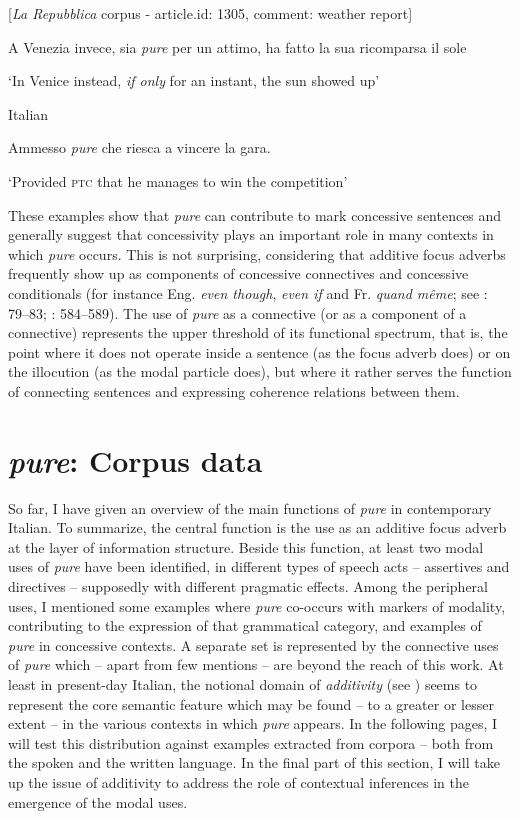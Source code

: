 \ea%
    \label{ex:key:29}

          [\textit{La Repubblica} corpus - article.id: 1305, comment: weather report]

A Venezia invece, sia \textit{pure} per un attimo, ha fatto la sua ricomparsa il sole

\glt ‘In Venice instead, \textit{if only} for an instant, the sun showed up’
    \z

\ea%
    \label{ex:key:30}

           Italian \citep[115]{Coniglio2008}

Ammesso \textit{pure} che riesca a vincere la gara.

\glt ‘Provided \textsc{ptc} that he manages to win the competition’
    \z

These examples show that \textit{pure} can contribute to mark concessive sentences and generally suggest that concessivity plays an important role in many contexts in which \textit{pure} occurs. This is not surprising, considering that additive focus adverbs frequently show up as components of concessive connectives and concessive conditionals (for instance Eng. \textit{even though}, \textit{even if} and Fr. \textit{quand même}; see \citealt{König1991}: 79–83; \citealt{HaspelmathKönig1998}: 584–589). The use of \textit{pure} as a connective (or as a component of a connective) represents the upper threshold of its functional spectrum, that is, the point where it does not operate inside a sentence (as the focus adverb does) or on the illocution (as the modal particle does), but where it rather serves the function of connecting sentences and expressing coherence relations between them.

\section{\textit{pure}: Corpus data}
\hypertarget{Toc124860652}{}
So far, I have given an overview of the main functions of \textit{pure} in contemporary Italian. To summarize, the central function is the use as an additive focus adverb at the layer of information structure. Beside this function, at least two modal uses of \textit{pure} have been identified, in different types of speech acts – assertives and directives – supposedly with different pragmatic effects. Among the peripheral uses, I mentioned some examples where \textit{pure} co-occurs with markers of modality, contributing to the expression of that grammatical category, and examples of \textit{pure} in concessive contexts. A separate set is represented by the connective uses of \textit{pure} which – apart from few mentions – are beyond the reach of this work. At least in present-day Italian, the notional domain of \textit{additivity} (see \citealt{CesareAndorno2017}) seems to represent the core semantic feature which may be found – to a greater or lesser extent – in the various contexts in which \textit{pure} appears. In the following pages, I will test this distribution against examples extracted from corpora – both from the spoken and the written language. In the final part of this section, I will take up the issue of additivity to address the role of contextual inferences in the emergence of the modal uses.


